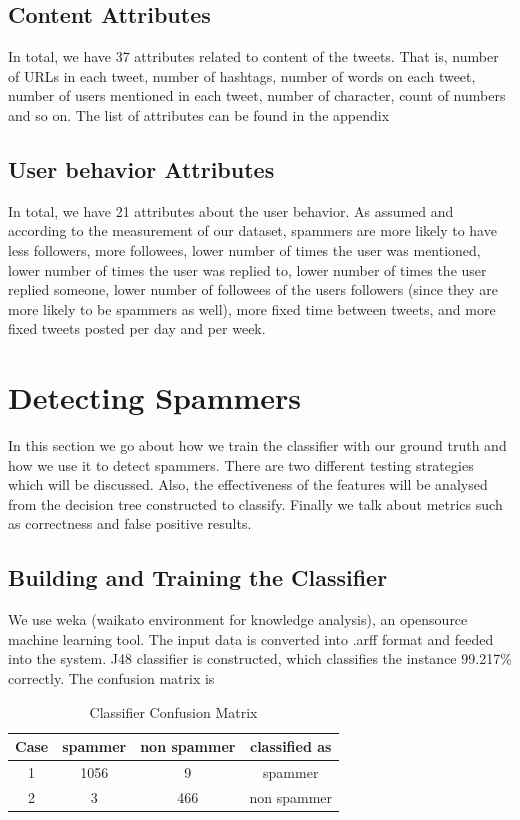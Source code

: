\documentclass[11pt]{article}
\begin{document}
\subsection{Content Attributes}
  In total, we have 37 attributes related to content of the tweets. That is, number of URLs in each tweet, number of hashtags, number of words on each tweet, number of users mentioned in each tweet, number of character, count of numbers and so on. The list of attributes can be found in the appendix
\subsection{User behavior Attributes}
 In total, we have 21 attributes about the user behavior. As assumed and according to the measurement of our dataset, spammers are more likely to have less followers, more followees, lower number of times the user was mentioned, lower number of times the user was replied to, lower number of times the user replied someone, lower number of followees of the users followers (since they are more likely to be spammers as well), more fixed time between tweets, and more fixed tweets posted per day and per week.


\section{Detecting Spammers}

In this section we go about how we train the classifier with our ground truth and how we use it to detect spammers. There are two different testing strategies which will be discussed. Also, the effectiveness of the features will be analysed from the decision tree constructed to classify. Finally we talk about metrics such as correctness and false positive results.

\subsection{Building and Training the Classifier}
We use weka (waikato environment for knowledge analysis), an opensource machine learning tool. The input data is converted into .arff format and feeded into the system. J48 classifier is constructed, which classifies the instance 99.217\% correctly. The confusion matrix is

\begin{table}[ht] 
\caption{Classifier Confusion Matrix} %
\centering %
\begin{tabular}{c c c c} %
\hline\hline %
Case & spammer & non spammer & classified as \\ [0.5ex] %
\hline %
1 & 1056 & 9 & spammer \\ %
2 & 3 & 466 & non spammer \\ [1ex] %
\hline %
\end{tabular} 
\label{table:nonlin} %
\end{table}
\end{document}
